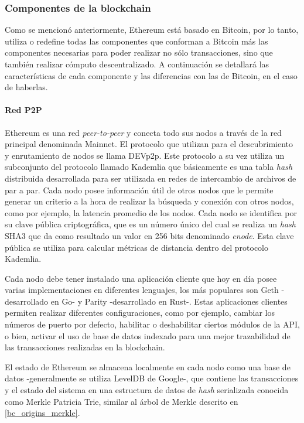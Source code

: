 \subsubsection{Componentes de la blockchain}

Como se mencionó anteriormente, Ethereum está basado en Bitcoin, por lo tanto, utiliza o redefine todas las componentes que conforman a Bitcoin más las componentes necesarias para poder realizar no sólo transacciones, sino que también realizar cómputo descentralizado. A continuación se detallará las características de cada componente y las diferencias con las de Bitcoin, en el caso de haberlas.

\paragraph{Red P2P}

Ethereum es una red \textit{peer-to-peer} y conecta todo sus nodos a través de la red principal denominada Mainnet. El protocolo que utilizan para el descubrimiento y enrutamiento de nodos se llama DEVp2p. Este protocolo a su vez utiliza un subconjunto del protocolo llamado Kademlia que básicamente es una tabla \textit{hash} distribuida desarrollada para ser utilizada en redes de intercambio de archivos de par a par.
Cada nodo posee información útil de otros nodos que le permite generar un criterio a la hora de realizar la búsqueda y conexión con otros nodos, como por ejemplo, la latencia promedio de los nodos. Cada nodo se identifica por su clave pública criptográfica, que es un número único del cual se realiza un \textit{hash} SHA3 que da como resultado un valor en 256 bits denominado \textit{enode}. Esta clave pública se utiliza para calcular métricas de distancia dentro del protocolo Kademlia.

Cada nodo debe tener instalado una aplicación cliente que hoy en día posee varias implementaciones en diferentes lenguajes, los más populares son Geth -desarrollado en Go- y Parity -desarrollado en Rust-. Estas aplicaciones clientes permiten realizar diferentes configuraciones, como por ejemplo, cambiar los números de puerto por defecto, habilitar o deshabilitar ciertos módulos de la API, o bien, activar el uso de base de datos indexado para una mejor trazabilidad de las transacciones realizadas en la blockchain.

El estado de Ethereum se almacena localmente en cada nodo como una base de datos -generalmente se utiliza LevelDB de Google-, que contiene las transacciones y el estado del sistema en una estructura de datos de \textit{hash} serializada conocida como Merkle Patricia Trie, similar al árbol de Merkle descrito en \ref{bc_origins_merkle}.

